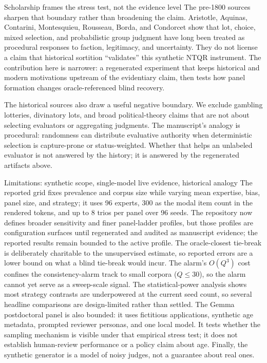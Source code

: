 \documentclass[
  ignorenonframetext,
]{beamer}
\begin{document}
\begin{frame}[allowframebreaks]{Scholarship frames the stress test, not
the evidence level}
The pre-1800 sources sharpen that boundary rather than broadening the
claim. Aristotle, Aquinas, Contarini, Montesquieu, Rousseau, Borda, and
Condorcet show that lot, choice, mixed selection, and probabilistic
group judgment have long been treated as procedural responses to
faction, legitimacy, and uncertainty. They do not license a claim that
historical sortition ``validates'' this synthetic NTQR instrument. The
contribution here is narrower: a regenerated experiment that keeps
historical and modern motivations upstream of the evidentiary claim,
then tests how panel formation changes oracle-referenced blind recovery.

The historical sources also draw a useful negative boundary. We exclude
gambling lotteries, divinatory lots, and broad political-theory claims
that are not about selecting evaluators or aggregating judgments. The
manuscript's analogy is procedural: randomness can distribute evaluative
authority when deterministic selection is capture-prone or
status-weighted. Whether that helps an unlabeled evaluator is not
answered by the history; it is answered by the regenerated artifacts
above.
\end{frame}

\begin{frame}{Limitations: synthetic scope,
single-model live evidence, historical analogy}
\protect{}\label{limitations-synthetic-scope-single-model-live-evidence-historical-analogy}
The reported  grid fixes prevalence and
corpus size while varying mean expertise, bias, panel size, and
strategy; it uses 96 experts, 300 as the modal item count in the
rendered tokens, and up to 8 trios per panel over 96 seeds. The
repository now defines broader sensitivity and finer panel-ladder
profiles, but those profiles are configuration surfaces until
regenerated and audited as manuscript evidence; the reported results
remain bounded to the active profile. The oracle-closest tie-break is
deliberately charitable to the unsupervised estimate, so reported errors
are a lower bound on what a blind tie-break would incur. The alarm's
\(O(Q^3)\) cost confines the consistency-alarm track to small corpora
(\(Q\leq30\)), so the alarm cannot yet serve as a sweep-scale signal.
The statistical-power analysis shows most strategy contrasts are
underpowered at the current seed count, so several headline comparisons
are design-limited rather than settled. The Gemma postdoctoral panel is
also bounded: it uses fictitious applications, synthetic age metadata,
prompted reviewer personas, and one local model. It tests whether the
sampling mechanism is visible under that empirical stress test; it does
not establish human-review performance or a policy claim about age.
Finally, the synthetic generator is a model of noisy judges, not a
guarantee about real ones.
\end{frame}
\end{document}
